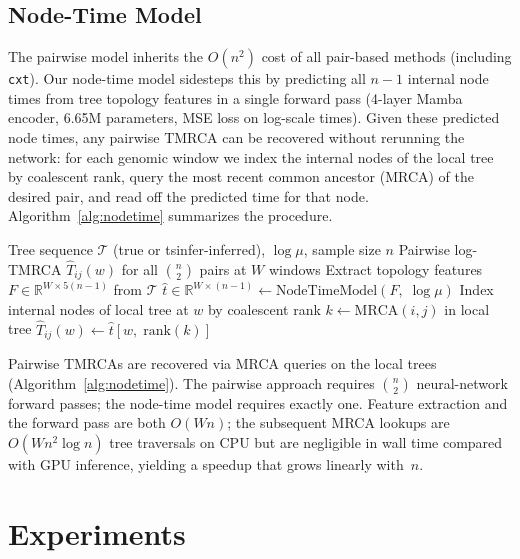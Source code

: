 \documentclass{article}
\begin{document}
\subsection{Node-Time Model}

The pairwise model inherits the $O(n^2)$ cost of all pair-based methods (including
\texttt{cxt}). Our node-time model sidesteps this by predicting all $n{-}1$ internal
node times from tree topology features in a single forward pass (4-layer Mamba encoder,
6.65M parameters, MSE loss on log-scale times). Given these predicted node times, any
pairwise TMRCA can be recovered without rerunning the network: for each genomic window we
index the internal nodes of the local tree by coalescent rank, query the most recent common
ancestor (MRCA) of the desired pair, and read off the predicted time for that node.
Algorithm~\ref{alg:nodetime} summarizes the procedure.

\begin{algorithm}[t]
\caption{Node-time inference for all pairwise TMRCAs}
\label{alg:nodetime}
\begin{algorithmic}[1]
\REQUIRE Tree sequence $\mathcal{T}$ (true or tsinfer-inferred), $\log\mu$, sample size $n$
\ENSURE Pairwise log-TMRCA $\hat{T}_{ij}(w)$ for all $\binom{n}{2}$ pairs at $W$ windows
\STATE Extract topology features $F \in \mathbb{R}^{W \times 5(n-1)}$ from $\mathcal{T}$
\STATE $\hat{t} \in \mathbb{R}^{W \times (n-1)} \leftarrow \text{NodeTimeModel}(F,\; \log\mu)$
  \STATE Index internal nodes of local tree at $w$ by coalescent rank
    \STATE $k \leftarrow \mathrm{MRCA}(i, j)$ in local tree
    \STATE $\hat{T}_{ij}(w) \leftarrow \hat{t}[w,\;\mathrm{rank}(k)]$
  \ENDFOR
\ENDFOR
\end{algorithmic}
\end{algorithm}

Pairwise TMRCAs are recovered via MRCA queries on the local trees
(Algorithm~\ref{alg:nodetime}). The pairwise approach requires $\binom{n}{2}$
neural-network forward passes; the node-time model requires exactly one.
Feature extraction and the forward pass are both $O(Wn)$; the subsequent
MRCA lookups are $O(W n^2 \log n)$ tree traversals on CPU but are negligible
in wall time compared with GPU inference, yielding a speedup that grows
linearly with~$n$.

\section{Experiments}
\end{document}
